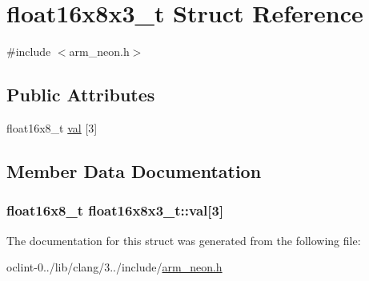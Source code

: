 \hypertarget{structfloat16x8x3__t}{\section{float16x8x3\-\_\-t Struct Reference}
\label{structfloat16x8x3__t}
}


{\ttfamily \#include $<$arm\-\_\-neon.\-h$>$}

\subsection*{Public Attributes}
\begin{DoxyCompactItemize}
\item 
float16x8\-\_\-t \hyperlink{structfloat16x8x3__t_afb185d3e5c5f5cbb55273e21b40eca25}{val} \mbox{[}3\mbox{]}
\end{DoxyCompactItemize}


\subsection{Member Data Documentation}
\hypertarget{structfloat16x8x3__t_afb185d3e5c5f5cbb55273e21b40eca25}{
\subsubsection[{val}]{\setlength{\rightskip}{0pt plus 5cm}float16x8\-\_\-t float16x8x3\-\_\-t\-::val\mbox{[}3\mbox{]}}}\label{structfloat16x8x3__t_afb185d3e5c5f5cbb55273e21b40eca25}


The documentation for this struct was generated from the following file\-:\begin{DoxyCompactItemize}
\item 
oclint-\/0../lib/clang/3../include/\hyperlink{arm__neon_8h}{arm\-\_\-neon.\-h}\end{DoxyCompactItemize}
